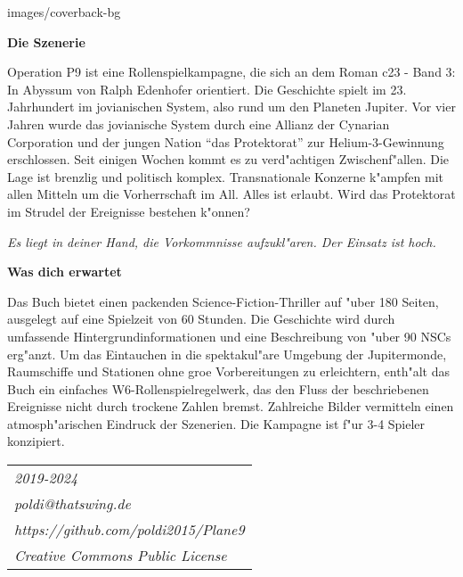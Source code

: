 \begin{backcover}{images/coverback-bg}

    \vspace{5mm}
    \textbf{Die Szenerie}

    Operation P9 ist eine Rollenspielkampagne, die sich an dem Roman c23 - Band 3: In Abyssum von Ralph Edenhofer orientiert. Die Geschichte spielt im 23. Jahrhundert im jovianischen System, also rund um den Planeten Jupiter. Vor vier Jahren wurde das jovianische System durch eine Allianz der Cynarian Corporation und der jungen Nation ``das Protektorat'' zur Helium-3-Gewinnung erschlossen. Seit einigen Wochen kommt es zu verd"achtigen Zwischenf"allen. Die Lage ist brenzlig und politisch komplex. Transnationale Konzerne k"ampfen mit allen Mitteln um die Vorherrschaft im All. Alles ist erlaubt. Wird das Protektorat im Strudel der Ereignisse bestehen k"onnen?

    \medskip
    \emph{Es liegt in deiner Hand, die Vorkommnisse aufzukl"aren. Der Einsatz ist hoch.}

    \vspace{5mm}
    \textbf{Was dich erwartet}

    Das Buch bietet einen packenden Science-Fiction-Thriller auf "uber 180 Seiten, ausgelegt auf eine Spielzeit von 60 Stunden. Die Geschichte wird durch umfassende Hintergrundinformationen und eine Beschreibung von "uber 90 NSCs erg"anzt. Um das Eintauchen in die spektakul"are Umgebung der Jupitermonde, Raumschiffe und Stationen ohne gro\3e Vorbereitungen zu erleichtern, enth"alt das Buch ein einfaches W6-Rollenspielregelwerk, das den Fluss der beschriebenen Ereignisse nicht durch trockene Zahlen bremst. Zahlreiche Bilder vermitteln einen atmosph"arischen Eindruck der Szenerien. Die Kampagne ist f"ur 3-4 Spieler konzipiert.

    \vspace{12mm}
    \newcommand{\footerentry}[1]{\textit{\normalsize{}{#1}}}
    \begin{tabularx}{\textwidth} {
        >{\raggedright\arraybackslash}X
    }
        \footerentry{2019-2024} \\
        \footerentry{poldi@thatswing.de}\\
        \footerentry{https://github.com/poldi2015/Plane9}\\
        \footerentry{Creative Commons Public License} 
    \end{tabularx}

\end{backcover}
